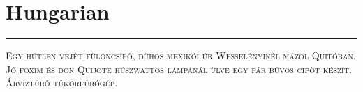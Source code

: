 \vspace{-1em}\section*{\checkyes Hungarian}
\vspace{-.5em}\hrule\vspace{.5em}
\noindent\textsc{
Egy hűtlen vejét fülöncsípő, dühös mexikói úr Wesselényinél mázol Quitóban.
Jó foxim és don Quijote húszwattos lámpánál ülve egy pár bűvös cipőt készít.
Árvíztűrő tükörfúrógép. 
}